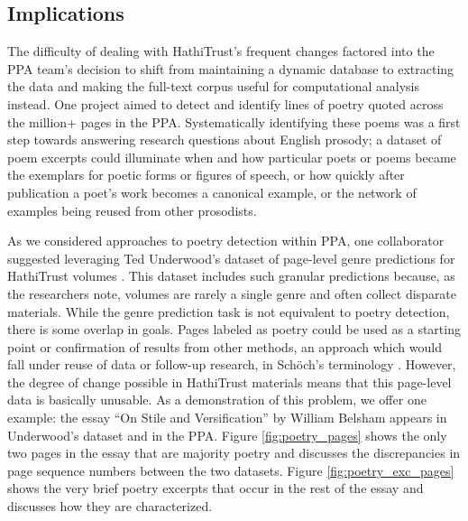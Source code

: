 \documentclass[final]{anthology-ch} %
\begin{document}
\subsection{Implications}

The difficulty of dealing with HathiTrust's frequent changes factored into the PPA team's decision to shift from maintaining a dynamic database to extracting the data and making the full-text corpus useful for computational analysis instead. One project aimed to detect and identify lines of poetry quoted across the million+ pages in the PPA. Systematically identifying these poems was a first step towards answering research questions about English prosody; a dataset of poem excerpts could illuminate when and how particular poets or poems became the exemplars for poetic forms or figures of speech, or how quickly after publication a poet’s work becomes a canonical example, or the network of examples being reused from other prosodists.

As we considered approaches to poetry detection within PPA, one collaborator suggested leveraging Ted Underwood's dataset of page-level genre predictions for HathiTrust volumes \cite{underwood_page-level_2014}. This dataset includes such granular predictions because, as the researchers note, volumes are rarely a single genre and often collect disparate materials. While the genre prediction task is not equivalent to poetry detection, there is some overlap in goals. Pages labeled as poetry could be used as a starting point or confirmation of results from other methods, an approach which would fall under reuse of data or follow-up research, in Schöch's terminology \autocite{schoch_repetitive_2023}. However, the degree of change possible in HathiTrust materials means that this page-level data is basically unusable. As a demonstration of this problem, we offer one example: the essay ``On Stile and Versification'' by William Belsham \cite{belsham_stile_1799} appears in Underwood's dataset and in the PPA. Figure \ref{fig:poetry_pages} shows the only two pages in the essay that are majority poetry and discusses the discrepancies in page sequence numbers between the two datasets. Figure \ref{fig:poetry_exc_pages} shows the very brief poetry excerpts that occur in the rest of the essay and discusses how they are characterized.
\end{document}
